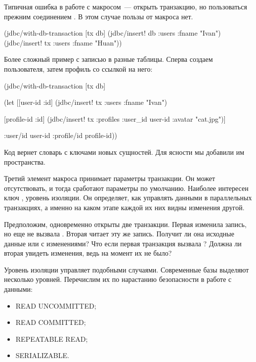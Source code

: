 Типичная ошибка в работе с макросом~--- открыть транзакцию, но пользоваться прежним соединением . В этом случае пользы от макроса нет.

\begin{english}
  \begin{clojure/lines}
(jdbc/with-db-transaction [tx db]
  (jdbc/insert! db :users {:fname "Ivan"})
  (jdbc/insert! tx :users {:fname "Huan"}))
  \end{clojure/lines}
\end{english}

Более сложный пример с записью в разные таблицы. Сперва создаем пользователя, затем профиль со ссылкой на него:

\begin{english}
  \begin{clojure}
(jdbc/with-db-transaction [tx db]

  (let [[{user-id :id}]
        (jdbc/insert! tx :users {:fname "Ivan"})

        [{profile-id :id}]
        (jdbc/insert! tx :profiles
                      {:user_id user-id
                       :avatar "cat.jpg"})]

    {:user/id user-id
     :profile/id profile-id}))
  \end{clojure}
\end{english}

Код вернет словарь с ключами новых сущностей. Для ясности мы добавили им пространства.


Третий элемент макроса принимает параметры транзакции. Он может отсутствовать, и тогда сработают параметры по умолчанию. Наиболее интересен ключ , уровень изоляции. Он определяет, как управлять данными в параллельных транзакциях, а именно на каком этапе каждой их них видны изменения другой.

Предположим, одновременно открыты две транзакции. Первая изменила запись, но еще не вызвала . Вторая читает эту же запись. Получит ли она исходные данные или с изменениями? Что если первая транзакция вызвала ? Должна ли вторая увидеть изменения, ведь на момент  их не было?

Уровень изоляции управляет подобными случаями. Современные базы выделяют несколько уровней. Перечислим их по нарастанию безопасности в работе с данными:

\begin{itemize}

\item
  READ UNCOMMITTED;

\item
  READ COMMITTED;

\item
  REPEATABLE READ;

\item
  SERIALIZABLE.

\end{itemize}


